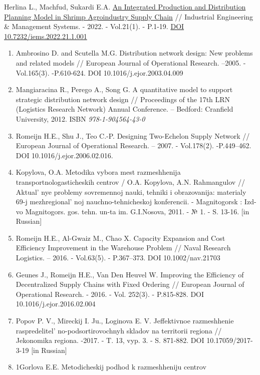Herlina L., Machfud, Sukardi E.A.
\href{http://www.iemsjl.org/journal/article.php?code=82679}{An
Integrated Production and Distribution Planning Model in Shrimp
Agroindustry Supply Chain} // Industrial Engineering \& Management
Systems. - 2022. - Vol.21(1). - P.1-19.
\href{https://doi.org/10.7232/iems.2022.21.1.001}{DOI
10.7232/iems.2022.21.1.001}

\begin{enumerate}
\def\labelenumi{\arabic{enumi}.}
\setcounter{enumi}{6}
\item
  Ambrosino D. and Scutella M.G. Distribution network design: New
  problems and related models // European Journal of Operational
  Research. --2005. -Vol.165(3). -P.610-624. DOI
  10.1016/j.ejor.2003.04.009
\item
  Mangiaracina R., Perego A., Song G. A quantitative model to support
  strategic distribution network design // Proceedings of the 17th LRN
  (Logistics Research Network) Annual Conference. -- Bedford: Cranfield
  University, 2012. ISBN \emph{978-1-904564-43-0}
\item
  Romeijn H.E., Shu J., Teo C.-P. Designing Two-Echelon Supply Network
  // European Journal of Operational Research. -- 2007. - Vol.178(2).
  -P.449--462. DOI 10.1016/j.ejor.2006.02.016.
\item
  Kopylova, O.A. Metodika vybora mest razmeshhenija
  transportnologasticheskih centrov / O.A. Kopylova, A.N. Rahmangulov //
  Aktual' nye problemy sovremennoj nauki, tehniki i
  obrazovanija: materialy 69-j mezhregional' noj
  nauchno-tehnicheskoj konferencii. - Magnitogorsk : Izd-vo Magnitogors.
  gos. tehn. un-ta im. G.I.Nosova, 2011. - № 1. - S. 13-16. {[}in
  Russian{]}
\item
  Romeijn H.E., Al-Gwaiz M., Chao X. Capacity Expansion and Cost
  Efficiency Improvement in the Warehouse Problem // Naval Research
  Logistics. -- 2016. - Vol.63(5). - P.367--373. DOI 10.1002/nav.21703
\item
  Geunes J., Romeijn H.E., Van Den Heuvel W. Improving the Efficiency of
  Decentralized Supply Chains with Fixed Ordering // European Journal of
  Operational Research. - 2016. - Vol. 252(3). - P.815-828. DOI
  10.1016/j.ejor.2016.02.004
\item
  Popov P. V., Mireckij I. Ju., Loginova E. V. Jeffektivnoe razmeshhenie
  raspredelitel' no-podsortirovochnyh skladov na
  territorii regiona // Jekonomika regiona. -2017. - T. 13, vyp. 3. - S.
  871-882. DOI 10.17059/2017-3-19 {[}in Russian{]}
\item
  1Gorlova E.E. Metodicheskij podhod k razmeshheniju centrov

\end{enumerate}
